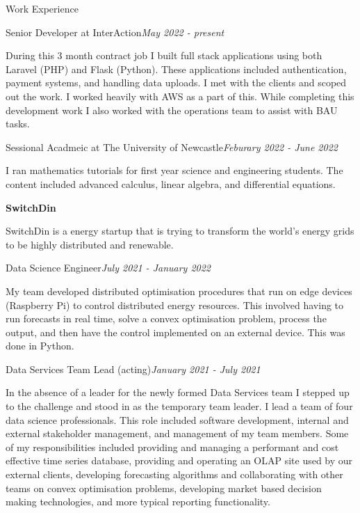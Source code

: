 \documentclass{resume} %
\begin{document}
\begin{rSection}{Work Experience}

    \begin{rSubsection}{Senior Developer at InterAction}{\em May 2022 - present}{}{}
        \item During this 3 month contract job I built full stack applications using both Laravel (PHP) and Flask (Python).
        These applications included authentication, payment systems, and handling data uploads.
        I met with the clients and scoped out the work. I worked heavily with AWS as a part of this.
        While completing this development work I also worked with the operations team to assist with BAU tasks.
    \end{rSubsection}

    \begin{rSubsection}{Sessional Acadmeic at The University of Newcastle}{\em Feburary 2022 - June 2022}{}{}
        \item I ran mathematics tutorials for first year science and engineering students.
        The content included advanced calculus, linear algebra, and differential equations.
    \end{rSubsection}

    {\bf SwitchDin}

    SwitchDin is a energy startup that is trying to transform the world's energy grids to be highly
    distributed and renewable.

    \begin{adjustwidth}{2em}{}
        \begin{rSubsection}{Data Science Engineer}{\em July 2021 - January 2022}{}{}
            \item My team developed distributed optimisation procedures that run on edge devices (Raspberry Pi) to control
            distributed energy resources. This involved having to run forecasts in real time, solve a convex optimisation problem, process the output, and
            then have the control implemented on an external device. This was done in Python.
        \end{rSubsection}

        \begin{rSubsection}{Data Services Team Lead (acting)}{\em January 2021 - July 2021}{}{}
            \item In the absence of a leader for the newly formed Data Services team I stepped up to the
            challenge and stood in as the temporary team leader. I lead a team of four data science
            professionals. This role included software development, internal and external stakeholder
            management, and management of my team members. Some of my responsibilities included providing
            and managing a performant and cost effective time series database, providing and operating an
            OLAP site used by our external clients, developing forecasting algorithms and collaborating
            with other teams on convex optimisation problems, developing market based decision making
            technologies, and more typical reporting functionality.
        \end{rSubsection}


\end{adjustwidth}
\end{rSection}
\end{document}
